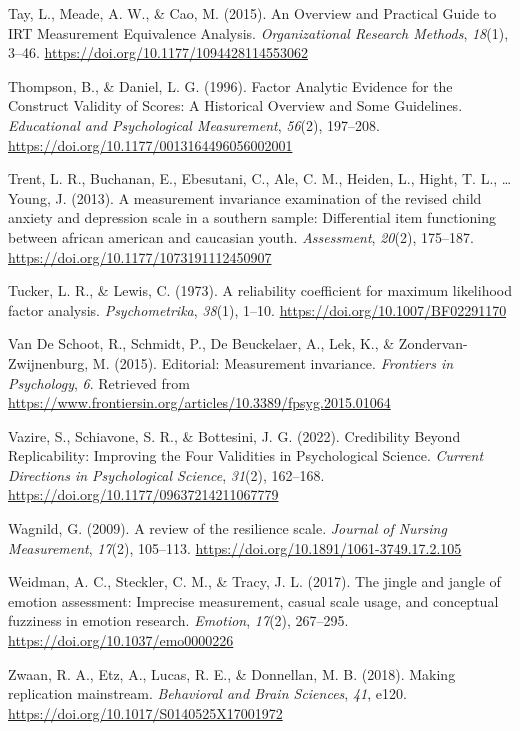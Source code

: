 \documentclass[
  man]{apa6}
\newlength{\cslhangindent}
\newlength{\cslentryspacingunit} %
\newenvironment{CSLReferences}[2] %
 {%
  \setlength{\parindent}{0pt}
  \ifodd #1
  \let\oldpar\par
  \def\par{\hangindent=\cslhangindent\oldpar}
  \fi
  \setlength{\parskip}{#2\cslentryspacingunit}
 }%
 {}
\begin{document}
\begin{CSLReferences}{1}{0}
\leavevmode{}%
Tay, L., Meade, A. W., \& Cao, M. (2015). An Overview and Practical Guide to IRT Measurement Equivalence Analysis. \emph{Organizational Research Methods}, \emph{18}(1), 3--46. \url{https://doi.org/10.1177/1094428114553062}

\leavevmode{}%
Thompson, B., \& Daniel, L. G. (1996). Factor Analytic Evidence for the Construct Validity of Scores: A Historical Overview and Some Guidelines. \emph{Educational and Psychological Measurement}, \emph{56}(2), 197--208. \url{https://doi.org/10.1177/0013164496056002001}

\leavevmode{}%
Trent, L. R., Buchanan, E., Ebesutani, C., Ale, C. M., Heiden, L., Hight, T. L., \ldots{} Young, J. (2013). A measurement invariance examination of the revised child anxiety and depression scale in a southern sample: Differential item functioning between african american and caucasian youth. \emph{Assessment}, \emph{20}(2), 175--187. \url{https://doi.org/10.1177/1073191112450907}

\leavevmode{}%
Tucker, L. R., \& Lewis, C. (1973). A reliability coefficient for maximum likelihood factor analysis. \emph{Psychometrika}, \emph{38}(1), 1--10. \url{https://doi.org/10.1007/BF02291170}

\leavevmode{}%
Van De Schoot, R., Schmidt, P., De Beuckelaer, A., Lek, K., \& Zondervan-Zwijnenburg, M. (2015). Editorial: Measurement invariance. \emph{Frontiers in Psychology}, \emph{6}. Retrieved from \url{https://www.frontiersin.org/articles/10.3389/fpsyg.2015.01064}

\leavevmode{}%
Vazire, S., Schiavone, S. R., \& Bottesini, J. G. (2022). Credibility Beyond Replicability: Improving the Four Validities in Psychological Science. \emph{Current Directions in Psychological Science}, \emph{31}(2), 162--168. \url{https://doi.org/10.1177/09637214211067779}

\leavevmode{}%
Wagnild, G. (2009). A review of the resilience scale. \emph{Journal of Nursing Measurement}, \emph{17}(2), 105--113. \url{https://doi.org/10.1891/1061-3749.17.2.105}

\leavevmode{}%
Weidman, A. C., Steckler, C. M., \& Tracy, J. L. (2017). The jingle and jangle of emotion assessment: Imprecise measurement, casual scale usage, and conceptual fuzziness in emotion research. \emph{Emotion}, \emph{17}(2), 267--295. \url{https://doi.org/10.1037/emo0000226}

\leavevmode{}%
Zwaan, R. A., Etz, A., Lucas, R. E., \& Donnellan, M. B. (2018). Making replication mainstream. \emph{Behavioral and Brain Sciences}, \emph{41}, e120. \url{https://doi.org/10.1017/S0140525X17001972}

\end{CSLReferences}
\end{document}
